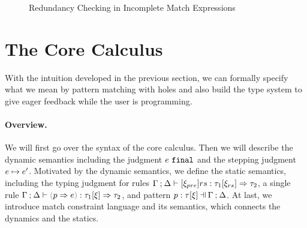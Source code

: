 \documentclass[runningheads,envcountsame,a4paper]{llncs}
\begin{document}
\begin{figure}[ht]
  \centering
  \hspace*{\fill}%
  \hfill%
  \hfill%
  \hspace*{\fill}%
  \caption{Redundancy Checking in Incomplete Match Expressions}
  \label{fig:red-hole}
\end{figure}

\section{The Core Calculus}
With the intuition developed in the previous section, we can formally specify
what we mean by pattern matching with holes and also build the type system to
give eager feedback while the user is programming.



\paragraph{Overview.}
We will first go over the syntax of the core calculus. Then we will describe the dynamic
semantics including the judgment $e ~\mathtt{final}$ and the stepping judgment
$e \mapsto e'$. Motivated by the dynamic semantics, we define the static
semantics, including the typing judgment for
rules $\Gamma \mathbin{;} \Delta \vdash [\xi_{pre}] rs : \tau_1 [\xi_{rs}] \Rightarrow \tau_2$, a
single rule $\chrultyp{\Gamma}{\Delta}{\hrulP{p}{e}}{\tau_1}{\xi}{\tau_2}$, and
pattern $\chpattyp{p}{\tau}{\xi}{\Gamma}{\Delta}$. At last, we introduce match constraint
language and its semantics, which connects the dynamics and the statics.
\end{document}
